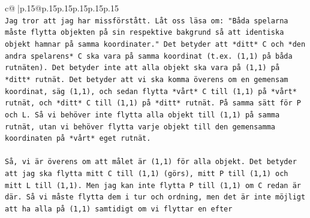 \documentclass{article}
\begin{document}
{\begin{supertabular}{c@{$\;$}|p{.15\linewidth}@{}p{.15\linewidth}p{.15\linewidth}p{.15\linewidth}p{.15\linewidth}p{.15\linewidth}}
{{{\\ 
\texttt{Jag tror att jag har missförstått. Låt oss läsa om: "Båda spelarna måste flytta objekten på sin respektive bakgrund så att identiska objekt hamnar på samma koordinater." Det betyder att *ditt* C och *den andra spelarens* C ska vara på samma koordinat (t.ex. (1,1) på båda rutnäten). Det betyder inte att alla objekt ska vara på (1,1) på *ditt* rutnät. Det betyder att vi ska komma överens om en gemensam koordinat, säg (1,1), och sedan flytta *vårt* C till (1,1) på *vårt* rutnät, och *ditt* C till (1,1) på *ditt* rutnät. På samma sätt för P och L. Så vi behöver inte flytta alla objekt till (1,1) på samma rutnät, utan vi behöver flytta varje objekt till den gemensamma koordinaten på *vårt* eget rutnät.} \\
\\ 
\texttt{Så, vi är överens om att målet är (1,1) för alla objekt. Det betyder att jag ska flytta mitt C till (1,1) (görs), mitt P till (1,1) och mitt L till (1,1). Men jag kan inte flytta P till (1,1) om C redan är där. Så vi måste flytta dem i tur och ordning, men det är inte möjligt att ha alla på (1,1) samtidigt om vi flyttar en efter} \\
            }
        }
    }
     \\ \\


\end{supertabular}}
\end{document}
